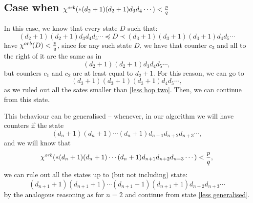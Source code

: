 \subsection{Case when ${\chi^{orb}(*(d_2+1)(d_2+1)d_3d_4\cdots)} < \frac{p}{q}$}\label{Less idea}

In this case, we know that every state $D$ such that:
\begin{equation}
(d_2+1)(d_2+1)d_3d_4d_5\cdots \preceq D\prec (d_3+1)(d_3+1)(d_3+1)d_4d_5\cdots
\end{equation}
have ${\chi^{orb}(D)} < \frac{p}{q}$, since for any such state $D$, we have that 
counter $c_3$ and all to the right of it are the same as in 
\begin{equation}
(d_2+1)(d_2+1)d_3d_4d_5\cdots,
\end{equation}
but counters $c_1$ and $c_2$ are at least equal to $d_2+1$. For this reason, we can 
go to 
\begin{equation}\label{less hop two}
(d_3+1)(d_3+1)(d_3+1)d_4d_5\cdots, 
\end{equation}
as we ruled out all the sates smaller than \ref{less hop two}. Then, we can continue 
from this state.

This behaviour can be generalised -- whenever, in our algorithm we will have counters 
if the state 
\begin{equation}
(d_n+1)(d_n+1)\cdots (d_n + 1)d_{n+1}d_{n+2}d_{n+3}\cdots,
\end{equation} 
and we will know that 
\begin{equation}
{\chi^{orb}(*(d_n+1)(d_n+1)\cdots (d_n + 1)d_{n+1}d_{n+2}d_{n+3}\cdots)} < \frac{p}{q},
\end{equation} 
we can rule out all the states up to (but not including) state:
\begin{equation}\label{less generalised}
(d_{n+1}+1)(d_{n+1}+1)\cdots (d_{n+1} + 1)(d_{n+1}+1)d_{n+2}d_{n+3}\cdots
\end{equation}
by the analogous reasoning as for $n = 2$ and continue from state \ref{less generalised}.

